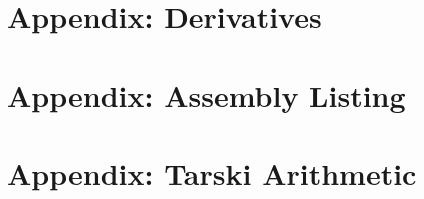 \documentclass[cup9a]{cupbook}
\def\skipXX#1{}
\begin{document}

    
    \label{part:appendix}
    \chapter{Appendix: Derivatives}
    \skipXX{} %
    \chapter{Appendix: Assembly Listing}
    \skipXX{} %
    \chapter{Appendix: Tarski Arithmetic}
    
    \skipXX{}
    \skipXX{}
\end{document}
